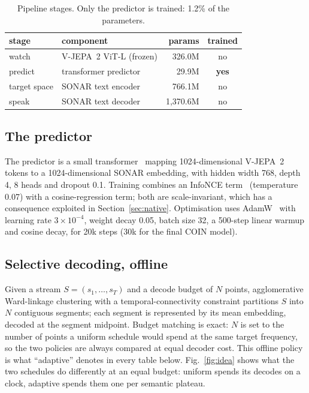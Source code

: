 \documentclass[journal]{IEEEtran}
\begin{document}
\begin{table}[t]
\caption{Pipeline stages. Only the predictor is trained: 1.2\% of the parameters.}
\label{tab:stages}
\centering
\footnotesize
\setlength{\tabcolsep}{4pt}
\begin{tabular}{llrc}
\toprule
stage & component & params & trained \\
\midrule
watch & V-JEPA~2 ViT-L (frozen) & 326.0M & no \\
predict & transformer predictor & 29.9M & \textbf{yes} \\
target space & SONAR text encoder & 766.1M & no \\
speak & SONAR text decoder & 1{,}370.6M & no \\
\bottomrule
\end{tabular}
\end{table}

\subsection{The predictor}
The predictor is a small transformer~\cite{transformer2017} mapping 1024-dimensional
V-JEPA~2 tokens to a 1024-dimensional SONAR embedding, with hidden width 768,
depth 4, 8 heads and dropout 0.1. Training combines an InfoNCE
term~\cite{cpc2018} (temperature 0.07) with a cosine-regression term; both are
scale-invariant, which has a consequence exploited in
Section~\ref{sec:native}. Optimisation uses AdamW~\cite{adamw2019} with learning
rate $3\times10^{-4}$, weight decay 0.05, batch size 32, a 500-step linear warmup
and cosine decay, for 20k steps (30k for the final COIN model).

\subsection{Selective decoding, offline}
Given a stream $S = (s_1,\dots,s_T)$ and a decode budget of $N$ points,
agglomerative Ward-linkage clustering with a temporal-connectivity constraint
partitions $S$ into $N$ contiguous segments; each segment is represented by its
mean embedding, decoded at the segment midpoint. Budget matching is exact: $N$ is
set to the number of points a uniform schedule would spend at the same target
frequency, so the two policies are always compared at equal decoder cost. This
offline policy is what ``adaptive'' denotes in every table below. Fig.~\ref{fig:idea}
shows what the two schedules do differently at an equal budget: uniform spends its
decodes on a clock, adaptive spends them one per semantic plateau.
\end{document}
